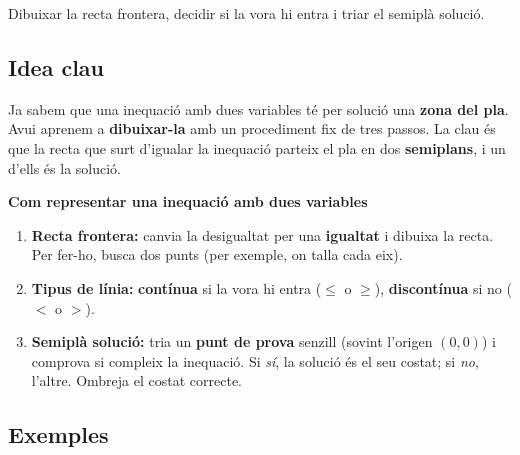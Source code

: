 %
{Dibuixar la recta frontera, decidir si la vora hi entra i triar el semiplà solució.}

\subsection{Idea clau}

Ja sabem que una inequació amb dues variables té per solució una \textbf{zona del
pla}. Avui aprenem a \textbf{dibuixar-la} amb un procediment fix de tres passos. La
clau és que la recta que surt d'igualar la inequació parteix el pla en dos
\textbf{semiplans}, i un d'ells és la solució.

\begin{idea}
\textbf{Com representar una inequació amb dues variables}
\begin{enumerate}[leftmargin=1.6em, itemsep=2pt]
  \item \textbf{Recta frontera:} canvia la desigualtat per una \textbf{igualtat} i
        dibuixa la recta. Per fer-ho, busca dos punts (per exemple, on talla cada eix).
  \item \textbf{Tipus de línia:} \textbf{contínua} si la vora hi entra ($\le$ o $\ge$),
        \textbf{discontínua} si no ($<$ o $>$).
  \item \textbf{Semiplà solució:} tria un \textbf{punt de prova} senzill (sovint
        l'origen $(0,0)$) i comprova si compleix la inequació. Si \emph{sí}, la solució
        és el seu costat; si \emph{no}, l'altre. Ombreja el costat correcte.
\end{enumerate}
\end{idea}

\subsection{Exemples}

